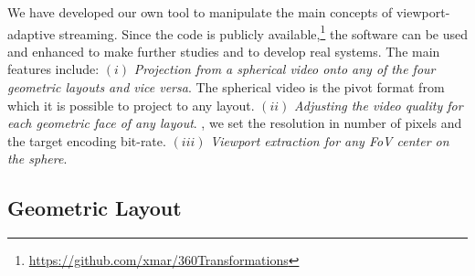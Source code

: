 We have developed our own tool to manipulate the main
concepts of viewport-adaptive streaming. Since the code is publicly
available,\footnote{\url{https://github.com/xmar/360Transformations}}
the software can be used and enhanced to make further studies and to
develop real systems. The main features include: $(i)$
\emph{Projection from a spherical video onto any of the four geometric
layouts and vice versa}. The spherical video is the pivot format from
which it is possible to project to any layout. 
 $(ii)$ \emph{Adjusting the video quality for each
geometric face of any layout}. , we set the resolution in
number of pixels and the target encoding bit-rate. 
$(iii)$ \emph{Viewport extraction for any
\ac{FoV} center on the sphere}. 

\subsection{Geometric Layout}

